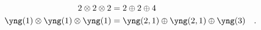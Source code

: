 {\begin{align*}
2\otimes 2\otimes 2 &= 2\oplus 2 \oplus 4 \\
\yng(1)\otimes\yng(1)\otimes\yng(1) &=
\yng(2,1)\oplus\yng(2,1)\oplus\yng(3)\quad.
\end{align*}}\\

\mymark

%  
%  
%  
